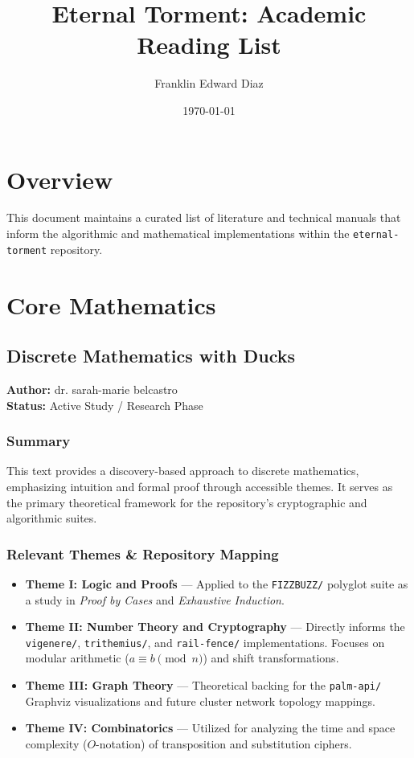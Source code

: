 \documentclass[11pt]{article}
\title{Eternal Torment: Academic Reading List}
\author{Franklin Edward Diaz}
\date{\today}
\begin{document}
\maketitle

\section*{Overview}
This document maintains a curated list of literature and technical manuals that inform the algorithmic and mathematical implementations within the \texttt{eternal-torment} repository.

\section{Core Mathematics}

\subsection*{Discrete Mathematics with Ducks}
\textbf{Author:} dr. sarah-marie belcastro \\
\textbf{Status:} Active Study / Research Phase

\subsubsection*{Summary}
This text provides a discovery-based approach to discrete mathematics, emphasizing intuition and formal proof through accessible themes. It serves as the primary theoretical framework for the repository's cryptographic and algorithmic suites.

\subsubsection*{Relevant Themes \& Repository Mapping}
\begin{itemize}
    \item \textbf{Theme I: Logic and Proofs} --- Applied to the \texttt{FIZZBUZZ/} polyglot suite as a study in \textit{Proof by Cases} and \textit{Exhaustive Induction}.
    \item \textbf{Theme II: Number Theory and Cryptography} --- Directly informs the \texttt{vigenere/}, \texttt{trithemius/}, and \texttt{rail-fence/} implementations. Focuses on modular arithmetic ($a \equiv b \pmod{n}$) and shift transformations.
    \item \textbf{Theme III: Graph Theory} --- Theoretical backing for the \texttt{palm-api/} Graphviz visualizations and future cluster network topology mappings.
    \item \textbf{Theme IV: Combinatorics} --- Utilized for analyzing the time and space complexity ($O$-notation) of transposition and substitution ciphers.
\end{itemize}
\end{document}
